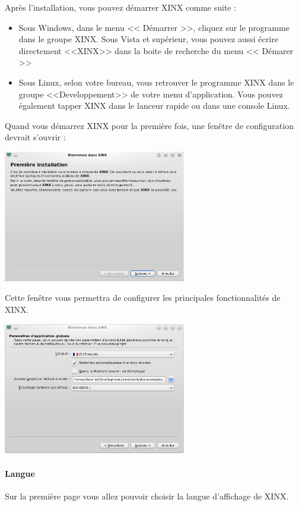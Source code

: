 \documentclass[a4paper,10pt,twoside]{book}
\begin{document}
Après l'installation, vous pouvez démarrer XINX comme suite :
\begin{itemize}
 \item Sous Windows, dans le menu << Démarrer >>, cliquez sur le programme dans le groupe XINX. Sous Vista et supérieur, vous pouvez aussi écrire directement <<XINX>> dans la boite de recherche du menu << Démarer >>
 \item Sous Linux, selon votre bureau, vous retrouver le programme XINX dans le groupe <<Developpement>> de votre menu d'application. Vous pouvez également tapper XINX dans le lanceur rapide ou dans une console Linux. 
\end{itemize}

Quand vous démarrez XINX pour la première fois, une fenêtre de configuration devrait s'ouvrir :

\begin{center}
 \includegraphics[width=0.60\textwidth]{./firstinstall1.png}
\end{center}

Cette fenêtre vous permettra de configurer les principales fonctionnalités de XINX. 

\begin{center}
 \includegraphics[width=0.60\textwidth]{./firstinstall2.png}
\end{center}

\paragraph{Langue} Sur la première page vous allez pouvoir choisir la langue d'affichage de XINX. 
\end{document}
